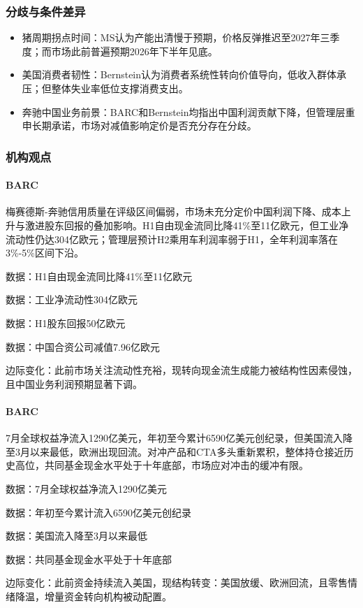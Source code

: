 \documentclass[11pt]{ctexart}
\begin{document}
\subsubsection*{分歧与条件差异}
\begin{itemize}
  \item 猪周期拐点时间：MS认为产能出清慢于预期，价格反弹推迟至2027年三季度；而市场此前普遍预期2026年下半年见底。
  \item 美国消费者韧性：Bernstein认为消费者系统性转向价值导向，低收入群体承压；但整体失业率低位支撑消费支出。
  \item 奔驰中国业务前景：BARC和Bernstein均指出中国利润贡献下降，但管理层重申长期承诺，市场对减值影响定价是否充分存在分歧。
\end{itemize}
\subsubsection*{机构观点}
\paragraph{BARC} 梅赛德斯-奔驰信用质量在评级区间偏弱，市场未充分定价中国利润下降、成本上升与激进股东回报的叠加影响。H1自由现金流同比降41\%至11亿欧元，但工业净流动性仍达304亿欧元；管理层预计H2乘用车利润率弱于H1，全年利润率落在3\%-5\%区间下沿。
{\small\color{refgray}数据：H1自由现金流同比降41\%至11亿欧元\par}
{\small\color{refgray}数据：工业净流动性304亿欧元\par}
{\small\color{refgray}数据：H1股东回报50亿欧元\par}
{\small\color{refgray}数据：中国合资公司减值7.96亿欧元\par}
{\small\color{refgray}边际变化：此前市场关注流动性充裕，现转向现金流生成能力被结构性因素侵蚀，且中国业务利润预期显著下调。\par}
\paragraph{BARC} 7月全球权益净流入1290亿美元，年初至今累计6590亿美元创纪录，但美国流入降至3月以来最低，欧洲出现回流。对冲产品和CTA多头重新累积，整体持仓接近历史高位，共同基金现金水平处于十年底部，市场应对冲击的缓冲有限。
{\small\color{refgray}数据：7月全球权益净流入1290亿美元\par}
{\small\color{refgray}数据：年初至今累计流入6590亿美元创纪录\par}
{\small\color{refgray}数据：美国流入降至3月以来最低\par}
{\small\color{refgray}数据：共同基金现金水平处于十年底部\par}
{\small\color{refgray}边际变化：此前资金持续流入美国，现结构转变：美国放缓、欧洲回流，且零售情绪降温，增量资金转向机构被动配置。\par}
\end{document}
